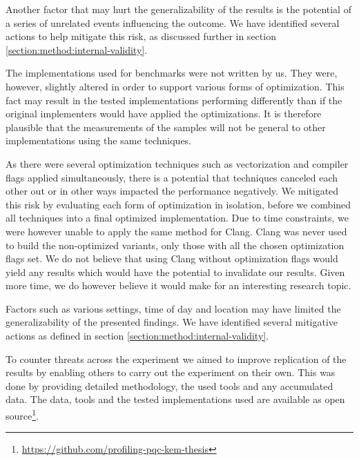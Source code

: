 Another factor that may hurt the generalizability of the results is the potential of a series of unrelated events influencing the outcome. We have identified several actions to help mitigate this risk, as discussed further in section \ref{section:method:internal-validity}.

The implementations used for benchmarks were not written by us. They were, however, slightly altered in order to support various forms of optimization. This fact may result in the tested implementations performing differently than if the original implementers would have applied the optimizations. It is therefore plausible that the measurements of the samples will not be general to other implementations using the same techniques.

As there were several optimization techniques such as vectorization and compiler flags applied simultaneously, there is a potential that techniques canceled each other out or in other ways impacted the performance negatively. We mitigated this risk by evaluating each form of optimization in isolation, before we combined all techniques into a final optimized implementation. Due to time constraints, we were however unable to apply the same method for Clang. Clang was never used to build the non-optimized variants, only those with all the chosen optimization flags set. We do not believe that using Clang without optimization flags would yield any results which would have the potential to invalidate our results. Given more time, we do however believe it would make for an interesting research topic.

Factors such as various settings, time of day and location may have limited the generalizability of the presented findings. We have identified several mitigative actions as defined in section \ref{section:method:internal-validity}.

To counter threats across the experiment we aimed to improve replication of the results by enabling others to carry out the experiment on their own. This was done by providing detailed methodology, the used tools and any accumulated data. The data, tools and the tested implementations used are available as open source\footnote{\url{https://github.com/profiling-pqc-kem-thesis}}.

\iffalse

